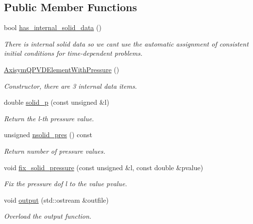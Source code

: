 \subsection*{Public Member Functions}
\begin{DoxyCompactItemize}
\item 
bool \hyperlink{classoomph_1_1AxisymQPVDElementWithPressure_af5a06f24c310d233555f165189ff353a}{has\+\_\+internal\+\_\+solid\+\_\+data} ()
\begin{DoxyCompactList}\small\item\em There is internal solid data so we can\textquotesingle{}t use the automatic assignment of consistent initial conditions for time-\/dependent problems. \end{DoxyCompactList}\item 
\hyperlink{classoomph_1_1AxisymQPVDElementWithPressure_a5b902a463ba218dd83d9641510a6fbfb}{Axisym\+Q\+P\+V\+D\+Element\+With\+Pressure} ()
\begin{DoxyCompactList}\small\item\em Constructor, there are 3 internal data items. \end{DoxyCompactList}\item 
double \hyperlink{classoomph_1_1AxisymQPVDElementWithPressure_a43a3e699d4e958d00d5ebc20ff23827b}{solid\+\_\+p} (const unsigned \&l)
\begin{DoxyCompactList}\small\item\em Return the l-\/th pressure value. \end{DoxyCompactList}\item 
unsigned \hyperlink{classoomph_1_1AxisymQPVDElementWithPressure_ac39d97adf69f12b20640ae10aeaec156}{nsolid\+\_\+pres} () const
\begin{DoxyCompactList}\small\item\em Return number of pressure values. \end{DoxyCompactList}\item 
void \hyperlink{classoomph_1_1AxisymQPVDElementWithPressure_aec1e7e2de41bd7eaff58fa31c9c47645}{fix\+\_\+solid\+\_\+pressure} (const unsigned \&l, const double \&pvalue)
\begin{DoxyCompactList}\small\item\em Fix the pressure dof l to the value pvalue. \end{DoxyCompactList}\item 
void \hyperlink{classoomph_1_1AxisymQPVDElementWithPressure_a1df3ba1290d73dd33634d5b99993dee7}{output} (std\+::ostream \&outfile)
\begin{DoxyCompactList}\small\item\em Overload the output function. \end{DoxyCompactList}\item 

\end{DoxyCompactItemize}
